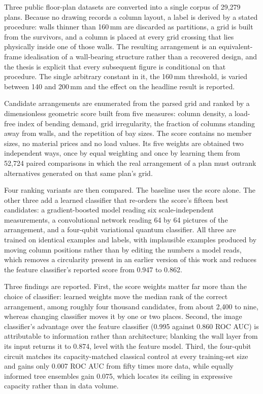 Three public floor-plan datasets are converted into a single corpus of
29,279 plans. Because no drawing records a column layout, a label is
derived by a stated procedure: walls thinner than 160\,mm are discarded as
partitions, a grid is built from the survivors, and a column is placed at
every grid crossing that lies physically inside one of those walls. The
resulting arrangement is an equivalent-frame idealisation of a
wall-bearing structure rather than a recovered design, and the thesis is
explicit that every subsequent figure is conditional on that procedure.
The single arbitrary constant in it, the 160\,mm threshold, is varied
between 140 and 200\,mm and the effect on the headline result is reported.

Candidate arrangements are enumerated from the parsed grid and ranked by a
dimensionless geometric score built from five measures: column density, a
load-free index of bending demand, grid irregularity, the fraction of
columns standing away from walls, and the repetition of bay sizes. The
score contains no member sizes, no material prices and no load values. Its
five weights are obtained two independent ways, once by equal weighting
and once by learning them from 52,724 paired comparisons in which the real
arrangement of a plan must outrank alternatives generated on that same
plan's grid.

Four ranking variants are then compared. The baseline uses the score
alone. The other three add a learned classifier that re-orders the
score's fifteen best candidates: a gradient-boosted model reading six
scale-independent measurements, a convolutional network reading 64 by 64
pictures of the arrangement, and a four-qubit variational quantum
classifier. All three are trained on identical examples and labels, with
implausible examples produced by moving column positions rather than by
editing the numbers a model reads, which removes a circularity present in
an earlier version of this work and reduces the feature classifier's
reported score from 0.947 to 0.862.

Three findings are reported. First, the score weights matter far more than
the choice of classifier: learned weights move the median rank of the
correct arrangement, among roughly four thousand candidates, from about
2,400 to nine, whereas changing classifier moves it by one or two places.
Second, the image classifier's advantage over the feature classifier
(0.995 against 0.860 ROC AUC) is attributable to information rather than
architecture; blanking the wall layer from its input returns it to 0.874,
level with the feature model. Third, the four-qubit circuit matches its
capacity-matched classical control at every training-set size and gains
only 0.007 ROC AUC from fifty times more data, while equally informed tree
ensembles gain 0.075, which locates its ceiling in expressive capacity
rather than in data volume.

